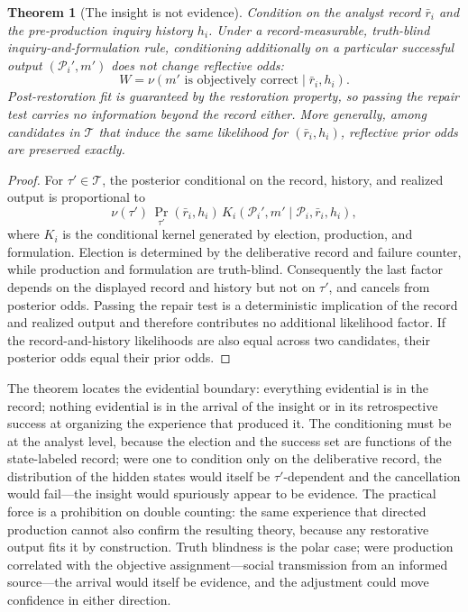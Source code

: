 \documentclass[11pt]{article}
\newtheorem{theorem}[assumption]{Theorem}
\theoremstyle{definition}
\begin{document}
\begin{theorem}[The insight is not evidence]
\label{thm:uninformative}
Condition on the analyst record $\bar r_i$ and the pre-production inquiry history $h_i$.
Under a record-measurable, truth-blind inquiry-and-formulation rule, conditioning additionally on a particular successful output $(\mathcal P_i',m')$ does not change reflective odds:
\[
W
=
\nu\!\left(
m'\text{ is objectively correct}
\mid \bar r_i,h_i
\right).
\]
Post-restoration fit is guaranteed by the restoration property, so passing the repair test carries no information beyond the record either.
More generally, among candidates in $\mathcal T$ that induce the same likelihood for $(\bar r_i,h_i)$, reflective prior odds are preserved exactly.
\end{theorem}

\begin{proof}
For $\tau'\in\mathcal T$, the posterior conditional on the record, history, and realized output is proportional to
\[
\nu(\tau')\,
\Pr_{\tau'}(\bar r_i,h_i)\,
K_i\!\left(
\mathcal P_i',m'
\mid\mathcal P_i,\bar r_i,h_i
\right),
\]
where $K_i$ is the conditional kernel generated by election, production, and formulation.
Election is determined by the deliberative record and failure counter, while production and formulation are truth-blind.
Consequently the last factor depends on the displayed record and history but not on $\tau'$, and cancels from posterior odds.
Passing the repair test is a deterministic implication of the record and realized output and therefore contributes no additional likelihood factor.
If the record-and-history likelihoods are also equal across two candidates, their posterior odds equal their prior odds.
\end{proof}

The theorem locates the evidential boundary: everything evidential is in the record; nothing evidential is in the arrival of the insight or in its retrospective success at organizing the experience that produced it.
The conditioning must be at the analyst level, because the election and the success set are functions of the state-labeled record; were one to condition only on the deliberative record, the distribution of the hidden states would itself be $\tau'$-dependent and the cancellation would fail---the insight would spuriously appear to be evidence.
The practical force is a prohibition on double counting: the same experience that directed production cannot also confirm the resulting theory, because any restorative output fits it by construction.
Truth blindness is the polar case; were production correlated with the objective assignment---social transmission from an informed source---the arrival would itself be evidence, and the adjustment could move confidence in either direction.
\end{document}
